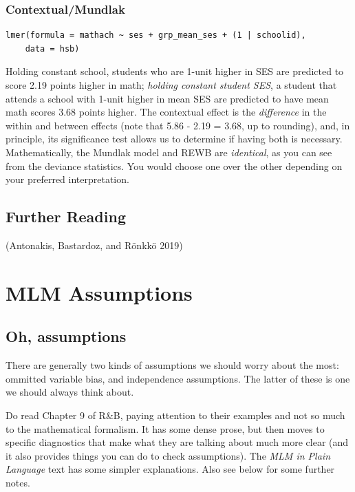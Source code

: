 \documentclass[
  letterpaper,
  DIV=11,
  numbers=noendperiod]{scrreprt}
\begin{document}
\hypertarget{contextualmundlak}{%
\subsection{Contextual/Mundlak}\label{contextualmundlak}}

\begin{verbatim}
lmer(formula = mathach ~ ses + grp_mean_ses + (1 | schoolid), 
    data = hsb)
\end{verbatim}

Holding constant school, students who are 1-unit higher in SES are
predicted to score 2.19 points higher in math; \emph{holding constant
student SES}, a student that attends a school with 1-unit higher in mean
SES are predicted to have mean math scores 3.68 points higher. The
contextual effect is the \emph{difference} in the within and between
effects (note that 5.86 - 2.19 = 3.68, up to rounding), and, in
principle, its significance test allows us to determine if having both
is necessary. Mathematically, the Mundlak model and REWB are
\emph{identical}, as you can see from the deviance statistics. You would
choose one over the other depending on your preferred interpretation.

\hypertarget{further-reading-1}{%
\section{Further Reading}\label{further-reading-1}}

(Antonakis, Bastardoz, and Rönkkö 2019)

\hypertarget{mlm-assumptions}{%
\chapter{MLM Assumptions}\label{mlm-assumptions}}

\hypertarget{oh-assumptions}{%
\section{Oh, assumptions}\label{oh-assumptions}}

There are generally two kinds of assumptions we should worry about the
most: ommitted variable bias, and independence assumptions. The latter
of these is one we should always think about.

Do read Chapter 9 of R\&B, paying attention to their examples and not so
much to the mathematical formalism. It has some dense prose, but then
moves to specific diagnostics that make what they are talking about much
more clear (and it also provides things you can do to check
assumptions). The \emph{MLM in Plain Language} text has some simpler
explanations. Also see below for some further notes.
\end{document}
